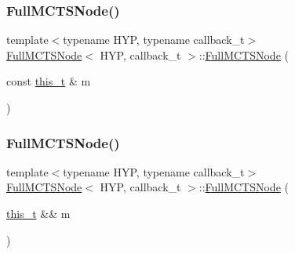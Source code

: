 \mbox{\label{class_full_m_c_t_s_node_a14947275f094e11f1ae2f709303ff8a8}} 
\subsubsection{\texorpdfstring{Full\+M\+C\+T\+S\+Node()}{FullMCTSNode()}\hspace{0.1cm}{\footnotesize\ttfamily [4/5]}}
{\footnotesize\ttfamily template$<$typename H\+YP, typename callback\+\_\+t$>$ \\
\hyperlink{class_full_m_c_t_s_node}{Full\+M\+C\+T\+S\+Node}$<$ H\+YP, callback\+\_\+t $>$\+::\hyperlink{class_full_m_c_t_s_node}{Full\+M\+C\+T\+S\+Node} (\begin{DoxyParamCaption}\item[{const \hyperlink{class_full_m_c_t_s_node_afcc6a60f2d45fd1d6c4bd5f4998b147d}{this\+\_\+t} \&}]{m }\end{DoxyParamCaption})\hspace{0.3cm}{\ttfamily [delete]}}

\mbox{\label{class_full_m_c_t_s_node_a1f86e401ffbc24dcbd1ac6913bec460f}} 
\subsubsection{\texorpdfstring{Full\+M\+C\+T\+S\+Node()}{FullMCTSNode()}\hspace{0.1cm}{\footnotesize\ttfamily [5/5]}}
{\footnotesize\ttfamily template$<$typename H\+YP, typename callback\+\_\+t$>$ \\
\hyperlink{class_full_m_c_t_s_node}{Full\+M\+C\+T\+S\+Node}$<$ H\+YP, callback\+\_\+t $>$\+::\hyperlink{class_full_m_c_t_s_node}{Full\+M\+C\+T\+S\+Node} (\begin{DoxyParamCaption}\item[{\hyperlink{class_full_m_c_t_s_node_afcc6a60f2d45fd1d6c4bd5f4998b147d}{this\+\_\+t} \&\&}]{m }\end{DoxyParamCaption})\hspace{0.3cm}{\ttfamily [inline]}}




